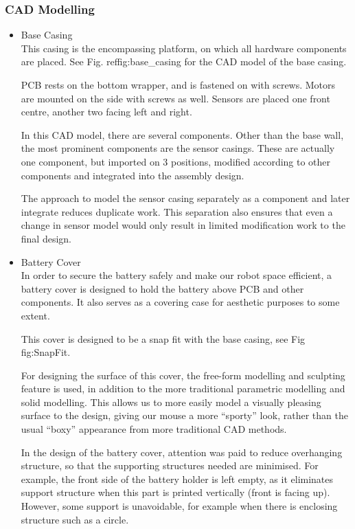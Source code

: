 \subsubsection{CAD Modelling}
\begin{itemize}
    \item Base Casing\\ 
    This casing is the encompassing platform, on which all hardware components are placed. See Fig. ref{fig:base_casing} for the CAD model of the base casing.

    PCB rests on the bottom wrapper, and is fastened on with screws. Motors are mounted on the side with screws as well. Sensors are placed one front centre, another two facing left and right.

    In this CAD model, there are several components. Other than the base wall, the most prominent components are the sensor casings. These are actually one component, but imported on 3 positions, modified according to other components and integrated into the assembly design. 

    The approach to model the sensor casing separately as a component and later integrate reduces duplicate work. This separation also ensures that even a change in sensor model would only result in limited modification work to the final design.
    

    \item Battery Cover\\ 
    In order to secure the battery safely and make our robot space efficient, a battery cover is designed to hold the battery above PCB and other components. It also serves as a covering case for aesthetic purposes to some extent.

    This cover is designed to be a snap fit with the base casing, see Fig {fig:SnapFit}.

    For designing the surface of this cover, the free-form modelling and sculpting feature is used, in addition to the more traditional parametric modelling and solid modelling. This allows us to more easily model a visually pleasing surface to the design, giving our mouse a more “sporty” look, rather than the usual “boxy” appearance from more traditional CAD methods.

    In the design of the battery cover, attention was paid to reduce overhanging structure, so that the supporting structures needed are minimised. For example, the front side of the battery holder is left empty, as it eliminates support structure when this part is printed vertically (front is facing up). However, some support is unavoidable, for example when there is enclosing structure such as a circle.

\end{itemize}


